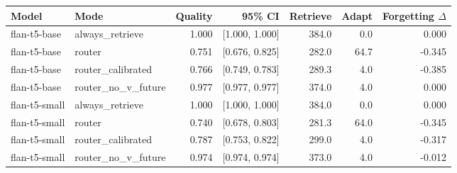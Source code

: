 \begin{tabular}{llrrrrr}
\toprule
Model & Mode & Quality & 95\% CI & Retrieve & Adapt & Forgetting $\Delta$ \\
\midrule
flan-t5-base & always\_retrieve & 1.000 & [1.000, 1.000] & 384.0 & 0.0 & 0.000 \\
flan-t5-base & router & 0.751 & [0.676, 0.825] & 282.0 & 64.7 & -0.345 \\
flan-t5-base & router\_calibrated & 0.766 & [0.749, 0.783] & 289.3 & 4.0 & -0.385 \\
flan-t5-base & router\_no\_v\_future & 0.977 & [0.977, 0.977] & 374.0 & 4.0 & 0.000 \\
flan-t5-small & always\_retrieve & 1.000 & [1.000, 1.000] & 384.0 & 0.0 & 0.000 \\
flan-t5-small & router & 0.740 & [0.678, 0.803] & 281.3 & 64.0 & -0.345 \\
flan-t5-small & router\_calibrated & 0.787 & [0.753, 0.822] & 299.0 & 4.0 & -0.317 \\
flan-t5-small & router\_no\_v\_future & 0.974 & [0.974, 0.974] & 373.0 & 4.0 & -0.012 \\
\bottomrule
\end{tabular}

